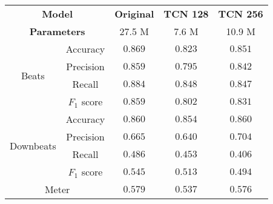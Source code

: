 \begin{tabular}{cc|ccc}
    \multicolumn{2}{c|}{\textbf{Model}} & \textbf{Original} & \textbf{TCN 128} & \textbf{TCN 256} \\
    \multicolumn{2}{c|}{\textbf{Parameters}} & 27.5 M & 7.6 M & 10.9 M \\\hline
    \multirow{4}{*}{Beats}     & Accuracy    & $\mathbf{0.869}$ & $0.823$ & $0.851$          \\
    & Precision   & $\mathbf{0.859}$ & $0.795$ & $0.842$          \\
    & Recall      & $\mathbf{0.884}$ & $0.848$ & $0.847$          \\
    & $F_1$ score & $\mathbf{0.859}$ & $0.802$ & $0.831$          \\\hline
    \multirow{4}{*}{Downbeats} & Accuracy    & $\mathbf{0.860}$ & $0.854$ & $\mathbf{0.860}$ \\
    & Precision   & $0.665$          & $0.640$ & $\mathbf{0.704}$ \\
    & Recall      & $\mathbf{0.486}$ & $0.453$ & $0.406$          \\
    & $F_1$ score & $\mathbf{0.545}$ & $0.513$ & $0.494$          \\\hline
    \multicolumn{2}{c|}{Meter} & $\mathbf{0.579}$ & $0.537$ & $0.576$ \\
\end{tabular}

